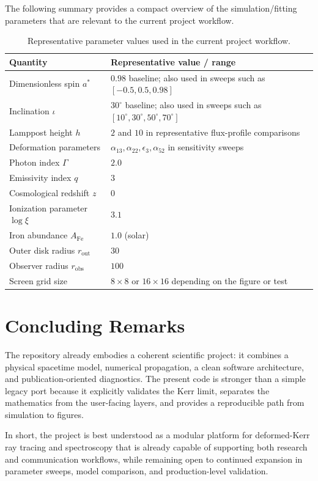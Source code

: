 \documentclass[11pt]{article}
\begin{document}
The following summary provides a compact overview of the simulation/fitting parameters that are relevant to the current project workflow.

\begin{table}[h]
\centering
\begin{tabular}{ll}
\toprule
\textbf{Quantity} & \textbf{Representative value / range} \\
\midrule
Dimensionless spin $a^*$ & $0.98$ baseline; also used in sweeps such as $[-0.5,0.5,0.98]$ \\
Inclination $\iota$ & $30^\circ$ baseline; also used in sweeps such as $[10^\circ,30^\circ,50^\circ,70^\circ]$ \\
Lamppost height $h$ & $2$ and $10$ in representative flux-profile comparisons \\
Deformation parameters & $\alpha_{13},\alpha_{22},\epsilon_3,\alpha_{52}$ in sensitivity sweeps \\
Photon index $\Gamma$ & $2.0$ \\
Emissivity index $q$ & $3$ \\
Cosmological redshift $z$ & $0$ \\
Ionization parameter $\log\xi$ & $3.1$ \\
Iron abundance $A_{\mathrm{Fe}}$ & $1.0$ (solar) \\
Outer disk radius $r_{\mathrm{out}}$ & $30$ \\
Observer radius $r_{\mathrm{obs}}$ & $100$ \\
Screen grid size & $8\times 8$ or $16\times 16$ depending on the figure or test \\
\bottomrule
\end{tabular}
\caption{Representative parameter values used in the current project workflow.}
\end{table}

\section{Concluding Remarks}

The repository already embodies a coherent scientific project: it combines a physical spacetime model, numerical propagation, a clean software architecture, and publication-oriented diagnostics. The present code is stronger than a simple legacy port because it explicitly validates the Kerr limit, separates the mathematics from the user-facing layers, and provides a reproducible path from simulation to figures.

In short, the project is best understood as a modular platform for deformed-Kerr ray tracing and spectroscopy that is already capable of supporting both research and communication workflows, while remaining open to continued expansion in parameter sweeps, model comparison, and production-level validation.
\end{document}
